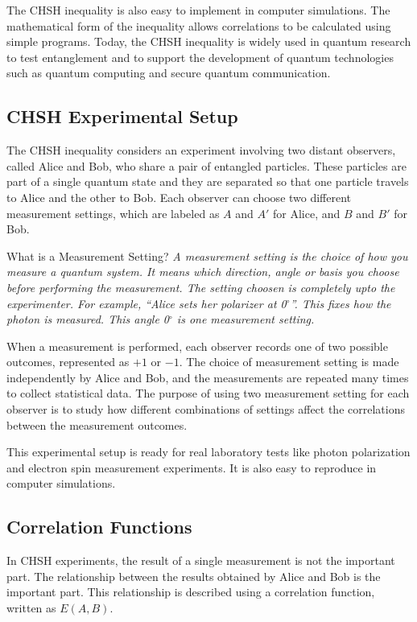 \documentclass[14pt,a4paper]{extarticle}
\begin{document}
The CHSH inequality is also easy to implement in computer simulations. The mathematical form of the inequality allows correlations to be calculated using simple programs. Today, the CHSH inequality is widely used in quantum research to test entanglement and to support the development of quantum technologies such as quantum computing and secure quantum communication.

\subsection{CHSH Experimental Setup}
The CHSH inequality considers an experiment involving two distant observers, called Alice and Bob, who share a pair of entangled particles. These particles are part of a single quantum state and they are separated so that one particle travels to Alice and the other to Bob. Each observer can choose two different measurement settings, which are labeled as $A$ and $A'$ for Alice, and $B$ and $B'$ for Bob.

\begin{conceptbox}{What is a Measurement Setting?}
\textit{A measurement setting is the choice of how you measure a quantum system. It means which direction, angle or basis you choose before performing the measurement. The setting choosen is completely upto the experimenter. For example, ``Alice sets her polarizer at 0$^\circ$''. This fixes how the photon is measured. This angle 0$^\circ$ is one measurement setting.}
\end{conceptbox}

When a measurement is performed, each observer records one of two possible outcomes, represented as $+1$ or $-1$. The choice of measurement setting is made independently by Alice and Bob, and the measurements are repeated many times to collect statistical data. The purpose of using two measurement setting for each observer is to study how different combinations of settings affect the correlations between the measurement outcomes.

This experimental setup is ready for real laboratory tests like photon polarization and electron spin measurement experiments. It is also easy to reproduce in computer simulations.

\subsection{Correlation Functions}
In CHSH experiments, the result of a single measurement is not the important part. The relationship between the results obtained by Alice and Bob is the important part. This relationship is described using a correlation function, written as $E(A,B)$.
\end{document}
